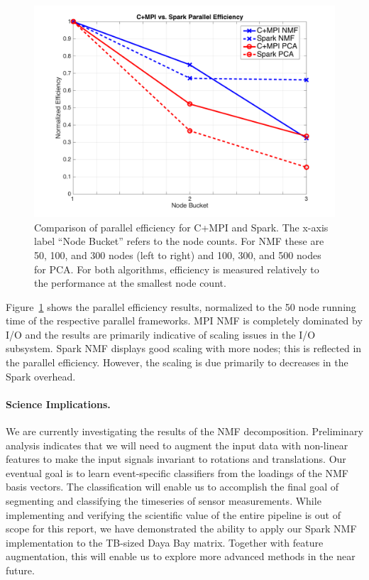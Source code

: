 \begin{figure}[h]
\centering
\includegraphics[width=.9\textwidth]{fig/peff.png}
\caption{Comparison of parallel efficiency for C+MPI and Spark. The x-axis label ``Node Bucket'' refers to the node counts. For NMF these are 50, 100, and 300 nodes (left to right) and 100, 300, and 500 nodes for PCA. For both algorithms, efficiency is measured relatively to the performance at the smallest node count.}
\label{fig:peff}
\end{figure}

Figure~\ref{fig:peff} shows the parallel efficiency results, normalized to the 50 node running time of the respective parallel frameworks. MPI NMF is completely dominated by I/O and the results are primarily indicative of scaling issues in the I/O subsystem. Spark NMF displays good scaling with more nodes; this is reflected in the parallel efficiency. However, the scaling is due primarily to decreases in the Spark overhead.

\paragraph{Science Implications.}
We are currently investigating the results of the NMF decomposition. Preliminary analysis indicates that we will need to augment the input data with non-linear features to make the input signals invariant to rotations and translations. Our eventual goal is to learn event-specific classifiers from the loadings of the NMF basis vectors. The classification will enable us to accomplish the final goal of segmenting and classifying the timeseries of sensor measurements. While implementing and verifying the scientific value of the entire pipeline is out of scope for this report, we have demonstrated the ability to apply our Spark NMF implementation to the TB-sized Daya Bay matrix. Together with feature augmentation, this will enable us to explore more advanced methods in the near future.

